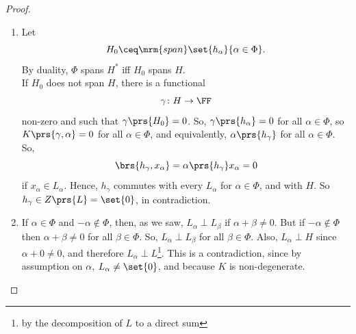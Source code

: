 \documentclass[10pt,a4paper,twoside,openany,hidelinks]{book}
\begin{document}
\begin{proof}
\begin{enumerate}
\item Let \[H_0 \ceq \mrm{span}\set{h_{\alpha}}{\alpha \in \Phi}\text{.}\]
By duality, $\Phi$ spans $H^*$ iff $H_0$ spans $H$.\\
If $H_0$ does not span $H$, there is a functional
\[\gamma \colon H \to \FF\]
non-zero and such that $\gamma\prs{H_0} = 0$.
So, $\gamma\prs{h_{\alpha}} = 0$ for all $\alpha \in \Phi$, so $K\prs{\gamma,\alpha} = 0$ for all $\alpha \in \Phi$, and equivalently, $\alpha\prs{h_{\gamma}}$ for all $\alpha \in \Phi$.\\
So, \[\brs{h_{\gamma}, x_{\alpha}} = \alpha\prs{h_{\gamma}} x_{\alpha} = 0\] if $x_{\alpha} \in L_{\alpha}$.
Hence, $h_{\gamma}$ commutes with every $L_{\alpha}$ for $\alpha \in \Phi$, and with $H$.
So $h_{\gamma} \in Z\prs{L} = \set{0}$, in contradiction.

\item If $\alpha \in \Phi$ and $-\alpha \notin \Phi$, then, as we saw, $L_{\alpha} \perp L_{\beta}$ if $\alpha + \beta \neq 0$.
But if $-\alpha \notin \Phi$ then $\alpha + \beta \neq 0$ for all $\beta \in \Phi$. So, $L_{\alpha} \perp L_{\beta}$ for all $\beta \in \Phi$.
Also, $L_{\alpha} \perp H$ since $\alpha + 0 \neq 0$, and therefore $L_{\alpha} \perp L$\footnote{by the decomposition of $L$ to a direct sum}.
This is a contradiction, since by assumption on $\alpha$, $L_{\alpha} \neq \set{0}$, and because $K$ is non-degenerate.


\end{enumerate}
\end{proof}
\end{document}
